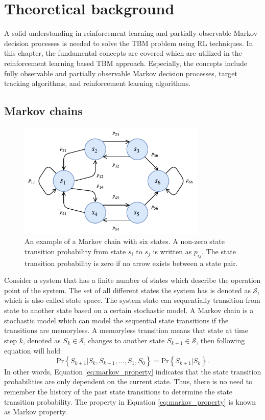\documentclass[english, 12pt, a4paper, elec, utf8, a-1b, online]{aaltothesis}
\newcommand{\Ss}{\mathcal{S}}
\renewcommand{\Pr}[1]{\text{Pr}\left\{ #1 \right\}}
\begin{document}
\newpage
\section{Theoretical background}

A solid understanding in reinforcement learning and partially observable Markov decision processes is needed to solve the TBM problem using RL techniques.
In this chapter, the fundamental concepts are covered which are utilized in the reinforcement learning based TBM approach.
Especially, the concepts include fully observable and partially observable Markov decision processes, target tracking algorithms, and reinforcement learning algorithms.


\subsection{Markov chains} \label{sec:MC}

\begin{figure}[b]
    \centering
    \includegraphics[width=0.8\textwidth]{figures/MarkovChain.pdf}
    \caption{
    An example of a Markov chain with six states. 
    A non-zero state transition probability from state $s_i$ to $s_j$ is written as $p_{ij}$.
    The state transition probability is zero if no arrow exists between a state pair. }
    \label{fig:mc}
\end{figure}


Consider a system that has a finite number of states which describe the operation point of the system.
The set of all different states the system has is denoted as $\Ss$, which is also called state space.
The system state can sequentially transition from state to another state based on a certain stochastic model.
A Markov chain is a stochastic model which can model the sequential state transitions if the transitions are memoryless.
A memoryless transition means that state at time step $k$, denoted as $S_k \in \Ss$, changes to another state $S_{k+1} \in \Ss$, then following equation will hold   
\begin{equation} \label{eq:markov_property}
    \Pr{S_{k+1} | S_k, S_{k-1}, ..., S_1, S_0} = \Pr{S_{k+1} | S_k}.
\end{equation}
In other words, Equation \eqref{eq:markov_property} indicates that the state transition probabilities are only dependent on the current state.
Thus, there is no need to remember the history of the past state transitions to determine the state transition probability.
The property in Equation \eqref{eq:markov_property} is known as Markov property.
\end{document}
